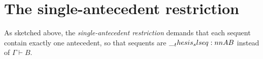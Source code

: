 







\section{The single-antecedent restriction}\label{sec:singleton-logic:restriction}

As sketched above, the \emph{single-antecedent restriction} demands that each sequent contain exactly one antecedent, so that sequents are $\slseq{A |- B}$ instead of $\Gamma \vdash B$.

